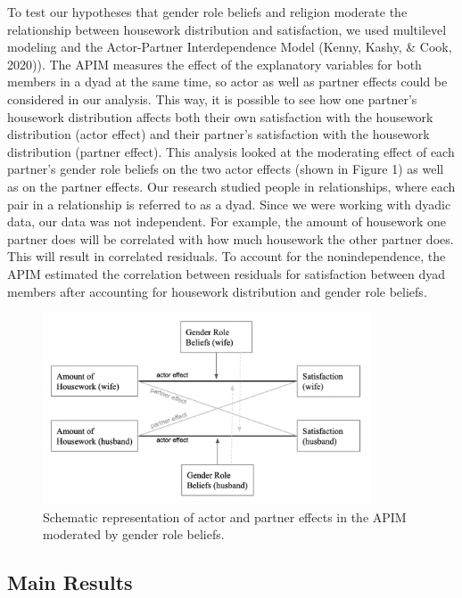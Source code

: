 \documentclass[
  man,floatsintext]{apa6}
\begin{document}
To test our hypotheses that gender role beliefs and religion moderate the relationship between housework distribution and satisfaction, we used multilevel modeling and the Actor-Partner Interdependence Model (Kenny, Kashy, \& Cook, 2020)). The APIM measures the effect of the explanatory variables for both members in a dyad at the same time, so actor as well as partner effects could be considered in our analysis. This way, it is possible to see how one partner's housework distribution affects both their own satisfaction with the housework distribution (actor effect) and their partner's satisfaction with the housework distribution (partner effect). This analysis looked at the moderating effect of each partner's gender role beliefs on the two actor effects (shown in Figure 1) as well as on the partner effects. Our research studied people in relationships, where each pair in a relationship is referred to as a dyad. Since we were working with dyadic data, our data was not independent. For example, the amount of housework one partner does will be correlated with how much housework the other partner does. This will result in correlated residuals. To account for the nonindependence, the APIM estimated the correlation between residuals for satisfaction between dyad members after accounting for housework distribution and gender role beliefs.



\begin{figure}
\includegraphics[width=3.83in]{APIM} \caption{Schematic representation of actor and partner effects in the APIM moderated by gender role beliefs.}\label{fig:unnamed-chunk-48}
\end{figure}

\hypertarget{main-results}{%
\subsection{Main Results}\label{main-results}}
\end{document}
